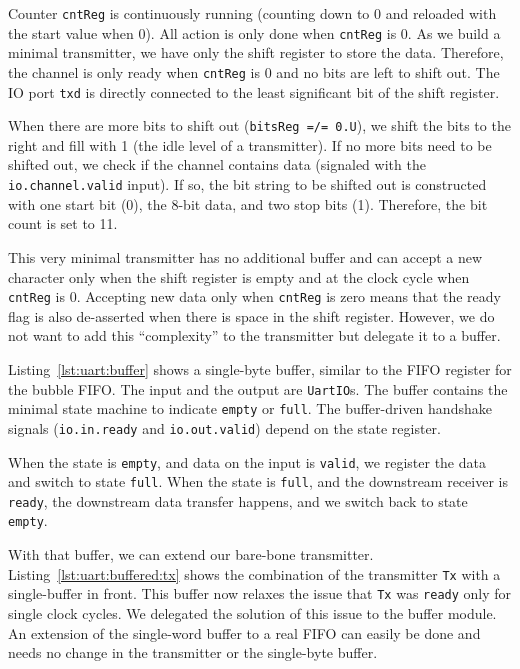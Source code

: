 \documentclass[%
    10pt,
    headinclude, footexclude,
    openright, %
    notitlepage,
    cleardoubleempty,
    headsepline,
    pointlessnumbers,
    bibtotoc, idxtotoc,
    ]{scrbook}
\newcommand{\code}[1]{{\lstinline[basicstyle=\small\ttfamily]{#1}}}
\begin{document}
Counter \code{cntReg} is continuously running (counting down to 0
and reloaded with the start value when 0). All action is only done when
\code{cntReg} is 0. As we build a minimal transmitter, we have only
the shift register to store the data. Therefore, the channel is only ready
when \code{cntReg} is 0 and no bits are left to shift out.
The IO port \code{txd} is directly connected to the least significant bit
of the shift register.

When there are more bits to shift out (\code{bitsReg =/= 0.U}),
we shift the bits to the right and fill with 1 (the idle level
of a transmitter).
If no more bits need to be shifted out, we check if the channel contains
data (signaled with the \code{io.channel.valid} input). If so, the bit string to
be shifted out is constructed with one start bit (0), the 8-bit data, and
two stop bits (1). Therefore, the bit count is set to 11.

This very minimal transmitter has no additional buffer and can
accept a new character only when the shift register is empty
and at the clock cycle when \code{cntReg} is 0.
Accepting new data only when \code{cntReg} is zero means
that the ready flag is also de-asserted when there is
space in the shift register. However, we do not want to add this
``complexity'' to the transmitter but delegate it to a buffer.


Listing~\ref{lst:uart:buffer} shows a single-byte buffer, similar to
the FIFO register for the bubble FIFO. The input and the output
are \code{UartIO}s.
The buffer contains the minimal state machine
to indicate \code{empty} or \code{full}. The buffer-driven handshake
signals (\code{io.in.ready} and \code{io.out.valid}) depend on the state
register.

When the state is \code{empty}, and data on the input is \code{valid},
we register the data and switch to state \code{full}.
When the state is \code{full}, and the downstream receiver is
\code{ready}, the downstream data transfer happens, and we switch
back to state \code{empty}.


With that buffer, we can extend our bare-bone transmitter.
Listing~\ref{lst:uart:buffered:tx} shows the combination of the transmitter \code{Tx}
with a single-buffer in front. This buffer now relaxes the issue that \code{Tx}
was \code{ready} only for single clock cycles. We delegated the solution of
this issue to the buffer module.
An extension of the single-word buffer to a real FIFO can easily be done
and needs no change in the transmitter or the single-byte buffer.
\end{document}
